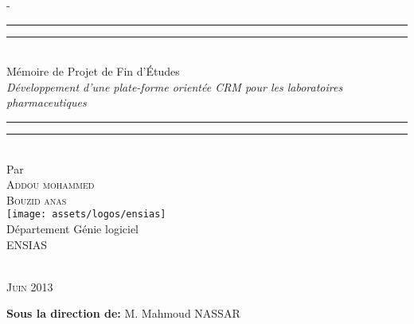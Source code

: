%
%
% 
%
%
\begin{titlingpage}
\begin{SingleSpace}
\calccentering{\unitlength} 
\begin{adjustwidth*}{\unitlength}{-\unitlength}
\vspace*{13mm}
\begin{center}
\rule[0.5ex]{\linewidth}{2pt}\vspace*{-\baselineskip}\vspace*{3.2pt}
\rule[0.5ex]{\linewidth}{1pt}\\[\baselineskip]
{\Large Mémoire de Projet de Fin d'Études}\\[4mm]
{\LARGE \textit{Développement d'une  plate-forme orientée \gls{CRM} pour les laboratoires pharmaceutiques}}\\
\rule[0.5ex]{\linewidth}{1pt}\vspace*{-\baselineskip}\vspace{3.2pt}
\rule[0.5ex]{\linewidth}{2pt}\\
\vspace{6.5mm}
{\large Par}\\
\vspace{6mm}
{\large\textsc{Addou mohammed \\ Bouzid anas}}\\
\vspace{11mm}
\texttt{[image: assets/logos/ensias]}\\
\vspace{1mm}
{\large Département Génie logiciel\\
\textsc{ENSIAS}}\\
\vspace{11mm}
\begin{minipage}{10cm}
\end{minipage}\\
\vspace{9mm}
{\large\textsc{Juin 2013}}
\vspace{6mm}
\end{center}
\begin{flushright}
{\small \textbf {Sous la direction de:} M. Mahmoud NASSAR}
\end{flushright}



\end{adjustwidth*}
\end{SingleSpace}
\end{titlingpage}

